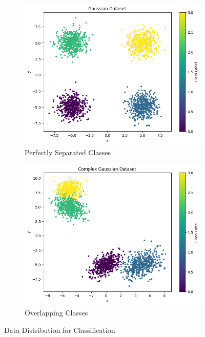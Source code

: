 \documentclass{article}
\begin{document}
\begin{figure}[h!]
  \centering
  \begin{subfigure}{0.45\textwidth}
    \includegraphics[width=\textwidth]{images/q1_data_dist_sep.png}
    \caption{Perfectly Separated Classes}
  \end{subfigure}
  \hspace{0.5cm}
  \begin{subfigure}{0.45\textwidth}
    \includegraphics[width=\textwidth]{images/q1_data_dist_ovlp.png}
    \caption{Overlapping Classes}
  \end{subfigure}
  \caption{Data Distribution for Classification}
  \label{fig:data_dist}
\end{figure}
\end{document}
